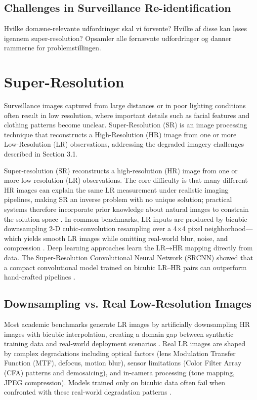 \subsection{Challenges in Surveillance Re-identification}
Hvilke domæne-relevante udfordringer skal vi forvente? Hvilke af disse kan løses igennem super-resolution? Opsamler alle førnævnte udfordringer og danner rammerne for problemstillingen. 


\section{Super-Resolution}
\label{sec:SuperResolution}

Surveillance images captured from large distances or in poor lighting conditions often result in low resolution, where important details such as facial features and clothing patterns become unclear. Super-Resolution (SR) is an image processing technique that reconstructs a High-Resolution (HR) image from one or more Low-Resolution (LR) observations, addressing the degraded imagery challenges described in Section 3.1.

Super-resolution (SR) reconstructs a high-resolution (HR) image from one or more low-resolution (LR) observations. The core difficulty is that many different HR images can explain the same LR measurement under realistic imaging pipelines, making SR an inverse problem with no unique solution; practical systems therefore incorporate prior knowledge about natural images to constrain the solution space \cite{Wang2019Survey}. In common benchmarks, LR inputs are produced by bicubic downsampling 2-D cubic-convolution resampling over a 4×4 pixel neighborhood—which yields smooth LR images while omitting real-world blur, noise, and compression \cite{Wang2019Survey}. Deep learning approaches learn the LR→HR mapping directly from data. The Super-Resolution Convolutional Neural Network (SRCNN) showed that a compact convolutional model trained on bicubic LR–HR pairs can outperform hand-crafted pipelines \cite{dong2015imagesuperresolutionusingdeep}.

\subsection{Downsampling vs. Real Low-Resolution Images}
\label{subsec:DownsamplingVsReal}

Most academic benchmarks generate LR images by artificially downsampling HR images with bicubic interpolation, creating a domain gap between synthetic training data and real-world deployment scenarios \cite{Agustsson2017NTIRE,Timofte2017NTIRE}. Real LR images are shaped by complex degradations including optical factors (lens Modulation Transfer Function (MTF), defocus, motion blur), sensor limitations (Color Filter Array (CFA) patterns and demosaicing), and in-camera processing (tone mapping, JPEG compression). Models trained only on bicubic data often fail when confronted with these real-world degradation patterns \cite{Cai2019RealSR,Wei2020DRealSR}.


